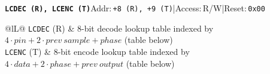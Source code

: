 \documentclass[10pt,a4paper]{article}
\newcommand{\reg}[1]{\texttt{#1}}
\newcommand{\reghead}[4]{%
  \noindent\colorbox{fillA}{\parbox{\dimexpr\linewidth-2\fboxsep\relax}{%
    \textbf{\color{accent}\texttt{#1}}\hfill{\footnotesize Addr:\,\texttt{#2}\enspace|\enspace Access:\,#3\enspace|\enspace Reset:\,#4}%
  }}%
}
\begin{document}
\par\vspace{5pt}\noindent\begin{minipage}{\linewidth}
\reghead{LCDEC (R), LCENC (T)}{+8 (R), +9 (T)}{R/W}{\texttt{0x00}}
\vspace{2pt}
{\small\begin{tabularx}{\linewidth}{@{}lL@{}}
\reg{LCDEC} (R) & 8-bit decode lookup table indexed by $4\cdot\mathit{pin} + 2\cdot\mathit{prev\ sample} + \mathit{phase}$ (table below) \\
\reg{LCENC} (T) & 8-bit encode lookup table indexed by $4\cdot\mathit{data} + 2\cdot\mathit{phase} + \mathit{prev\ output}$ (table below) \\
\end{tabularx}\par}
\end{minipage}\par
\end{document}
